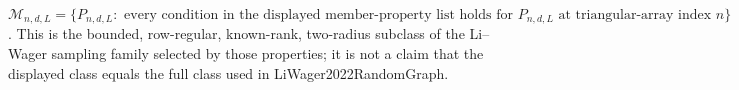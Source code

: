 \(\mathcal M_{n,d,L}=\{P_{n,d,L}:\text{ every condition in the displayed member-property list holds for }P_{n,d,L}\text{ at triangular-array index }n\}\).  This is the bounded, row-regular, known-rank, two-radius subclass of the Li--Wager sampling family selected by those properties; it is not a claim that the displayed class equals the full class used in LiWager2022RandomGraph.